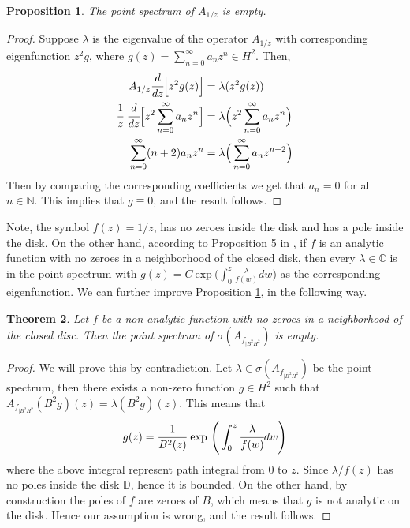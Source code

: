 \documentclass[preprint,12pt]{elsarticle} %
\theoremstyle{plain}
\newtheorem{theorem}{Theorem}[section]
\newtheorem{proposition}[theorem]{Proposition}
\theoremstyle{definition}
\theoremstyle{remark}
\begin{document}
\begin{proposition}\label{pro 5.1}
    The point spectrum of $A_{1/z}$ is empty.
\end{proposition}
\begin{proof}
    Suppose $\lambda$ is the eigenvalue of the operator $A_{1/z}$ with corresponding eigenfunction $z^2 g$, where $g(z)=\sum\limits_{n=0}^{\infty}a_n z^n\in H^2$. Then, 
    \begin{align*}
        A_{1/z}\cfrac{d}{dz}\Big[z^2g(z)\Big] &= \lambda (z^2g(z))\\
        \cfrac{1}{z} ~\cfrac{d}{dz}\Big[z^2 \sum\limits_{n=0}^{\infty}a_n z^n\Big] &= \lambda \Big(z^2 \sum\limits_{n=0}^{\infty}a_n z^n \Big)\\
        \sum\limits_{n=0}^{\infty}(n+2)a_n z^n &=  \lambda \Big( \sum\limits_{n=0}^{\infty}a_n z^{n+2} \Big)
    \end{align*}
    Then by comparing the corresponding coefficients we get that $a_n=0$ for all $n\in \mathbb{N}$. This implies that $g\equiv 0$, and the result follows.
\end{proof}

Note, the symbol $f(z)=1/z$, has no zeroes inside the disk and has a pole inside the disk. On the other hand, according to Proposition 5 in \cite{russo2022liouville}, if $f$ is an analytic function with no zeroes in a neighborhood of the closed disk, then every $\lambda \in \mathbb{C}$ is in the point spectrum with $g(z)=C~\text{exp}~\Big(\int_{0}^{z}\frac{\lambda}{f(w)}dw\Big)$ as the corresponding eigenfunction. We can further improve Proposition \ref{pro 5.1}, in the following way.


\begin{theorem}\label{Thm 5.2}
    Let $f$ be a non-analytic function with no zeroes in a neighborhood of the closed disc. Then the point spectrum of $\sigma(A_{f_{|B^2 H^2}})$ is empty.
\end{theorem}
\begin{proof}
    We will prove this by contradiction. Let $\lambda \in\sigma(A_{f_{|B^2 H^2}})$ be the point spectrum, then there exists a non-zero function $g\in H^2$ such that $A_{f_{|B^2 H^2}}(B^2g)(z)=\lambda (B^2g)(z)$. This means that
    \begin{equation}\label{Eq 2}
        g(z)=\cfrac{1}{B^2(z)}~\text{exp}~\Bigg(\int_{0}^{z}\cfrac{\lambda}{f(w)}dw\Bigg)
    \end{equation}
 where the above integral represent path integral from $0$ to $z$. Since $\lambda/f(z)$ has no poles inside the disk $\mathbb{D}$, hence it is bounded. On the other hand, by construction the poles of $f$ are zeroes of $B$, which means that $g$ is not analytic on the disk. Hence our assumption is wrong, and the result follows. 
\end{proof}
\end{document}
